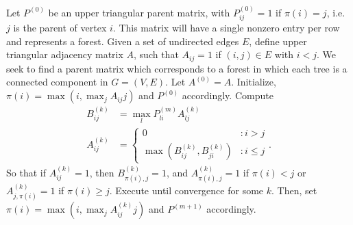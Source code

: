 \documentclass[11pt]{article}
\title{}
\author{}
\begin{document}
\maketitle

Let $P^{(0)}$ be an upper triangular parent matrix, with $P^{(0)}_{ij} = 1$ if $\pi(i)=j$, i.e. $j$ is the parent of vertex $i$.
This matrix will have a single nonzero entry per row and represents a forest.
Given a set of undirected edges $E$, define upper triangular adjacency matrix $A$, such that $A_{ij}=1$ if $(i,j)\in E$ with $i<j$.
We seek to find a parent matrix which corresponds to a forest in which each tree is a connected component in $G=(V,E)$.
Let $A^{(0)}=A$.
Initialize, $\pi(i)=\max(i,\max_{j} A_{ij}j)$ and $P^{(0)}$ accordingly.
Compute
\begin{align*}
B^{(k)}_{ij} &= \max_{l} P^{(m)}_{li} A^{(k)}_{lj}  \\
A^{(k)}_{ij} &= \begin{cases} 0 &: i>j \\ \max(B^{(k)}_{ij},B^{(k)}_{ji}) &: i\leq j \end{cases}.
\end{align*}
So that if $A_{ij}^{(k)}=1$, then $B_{\pi(i),j}^{(k)}=1$, and $A_{\pi(i),j}^{(k)}=1$ if $\pi(i)<j$ or $A_{j,\pi(i)}^{(k)}=1$ if $\pi(i)\geq j$.
Execute until convergence for some $k$.
Then, set $\pi(i)=\max(i,\max_{j} A^{(k)}_{ij}j)$ and $P^{(m+1)}$ accordingly.
\end{document}
